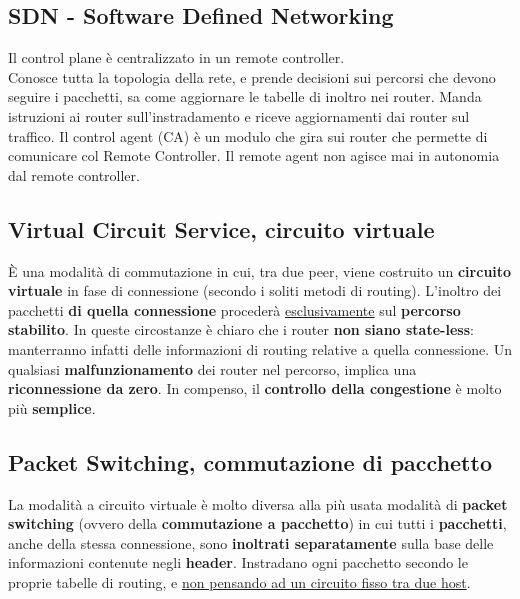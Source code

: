 \subsection{SDN - Software Defined Networking}
Il control plane è centralizzato in un remote controller.\\
Conosce tutta la topologia della rete, e prende decisioni sui percorsi che devono seguire i pacchetti, sa come aggiornare le tabelle di inoltro nei router. Manda istruzioni ai router sull'instradamento e riceve aggiornamenti dai router sul traffico. Il control agent (CA) è un modulo che gira sui router che permette di comunicare col Remote Controller. Il remote agent non agisce mai in autonomia dal remote controller.

\subsection{Virtual Circuit Service, circuito virtuale}
È una modalità di commutazione in cui, tra due peer, viene costruito un \textbf{circuito virtuale} in fase di connessione (secondo i soliti metodi di routing). L'inoltro dei pacchetti \textbf{di quella connessione} procederà \underline{esclusivamente} sul \textbf{percorso stabilito}. In queste circostanze è chiaro che i router \textbf{non siano state-less}: manterranno infatti delle informazioni di routing relative a quella connessione. Un qualsiasi \textbf{malfunzionamento} dei router nel percorso, implica una \textbf{riconnessione da zero}. In compenso, il \textbf{controllo della congestione} è molto più \textbf{semplice}. 

\subsection{Packet Switching, commutazione di pacchetto}
La modalità a circuito virtuale è molto diversa alla più usata modalità di \textbf{packet switching} (ovvero della \textbf{commutazione a pacchetto}) in cui tutti i \textbf{pacchetti}, anche della stessa connessione, sono \textbf{inoltrati separatamente} sulla base delle informazioni contenute negli \textbf{header}. Instradano ogni pacchetto secondo le proprie tabelle di routing, e \underline{non pensando ad un circuito fisso tra due host}.


